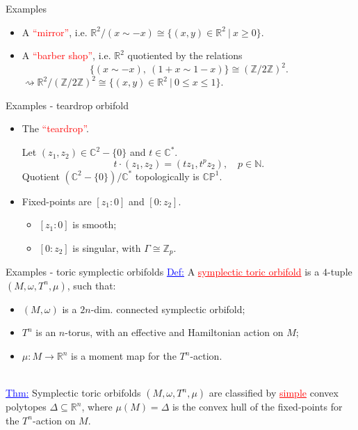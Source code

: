 \documentclass[aspectratio=169,xcolor=dvipsnames]{beamer}
\newcommand{\ra}{\rightarrow}
\newcommand{\NN}{\mathbb{N}}
\newcommand{\ZZ}{\mathbb{Z}}
\newcommand{\RR}{\mathbb{R}}
\newcommand{\CC}{\mathbb{C}}
\newcommand{\PP}{\mathbb{P}}
\newcommand{\w}{\omega}
\begin{document}
\begin{frame}{Examples}
	\begin{itemize}
		\item A \textcolor{red}{``mirror''}, i.e. $\RR^{2}/(x \sim -x) \cong \{(x,y) \in \RR^{2}\ |\ x \geq 0\}$.
		\hfill \break
		\item A \textcolor{red}{``barber shop''}, i.e. $\RR^{2}$ quotiented by the relations
		\[
		\{(x \sim -x),\ (1 + x \sim 1 - x)\} \cong (\ZZ/2\ZZ)^{2}.
		\]
		$\rightsquigarrow \RR^{2} / (\ZZ/2\ZZ)^{2} \cong \{(x,y) \in \RR^{2}\ |\ 0 \leq x \leq 1 \}$.
	\end{itemize}
\end{frame}

\begin{frame}{Examples - teardrop orbifold}
	\begin{itemize}
		\item The \textcolor{red}{``teardrop''}.
		
		Let $(z_{1}, z_{2}) \in \CC^{2} - \{0\}$ and $t \in \CC^{\ast}$.
		\[
		t \cdot (z_{1}, z_{2}) = (tz_{1}, t^{p}z_{2}), \quad p \in \NN.
		\]
		Quotient $\left(\CC^{2} - \{0\}\right)/\CC^{\ast}$ topologically is $\CC\PP^{1}$.
		\hfill \break
		\item Fixed-points are $[z_{1}:0]$ and $[0:z_{2}]$.
		\begin{itemize}
			\item $[z_{1}:0]$ is smooth;
			\item $[0:z_{2}]$ is singular, with $\Gamma \cong \ZZ_{p}$.
		\end{itemize}
	\end{itemize}
\end{frame}

\begin{frame}{Examples - toric symplectic orbifolds}
	\textcolor{blue}{\underline{Def:}} A \textcolor{red}{\underline{symplectic toric orbifold}} is a $4$-tuple $(M, \w, T^{n}, \mu)$, such that:
	\begin{itemize}
		\item $(M,\w)$ is a $2n$-dim. connected symplectic orbifold;
		\item $T^{n}$ is an $n$-torus, with an effective and Hamiltonian action on $M$;
		\item $\mu : M \ra \RR^{n}$ is a moment map for the $T^{n}$-action.
	\end{itemize}
	\hfill \\
	\textcolor{blue}{\underline{Thm:}} Symplectic toric orbifolds $(M, \w, T^{n}, \mu)$ are classified by \textcolor{red}{\underline{simple}} convex polytopes $\Delta \subseteq \RR^{n}$, where $\mu(M) = \Delta$ is the convex hull of the fixed-points for the $T^{n}$-action on $M$.
\end{frame}
\end{document}
